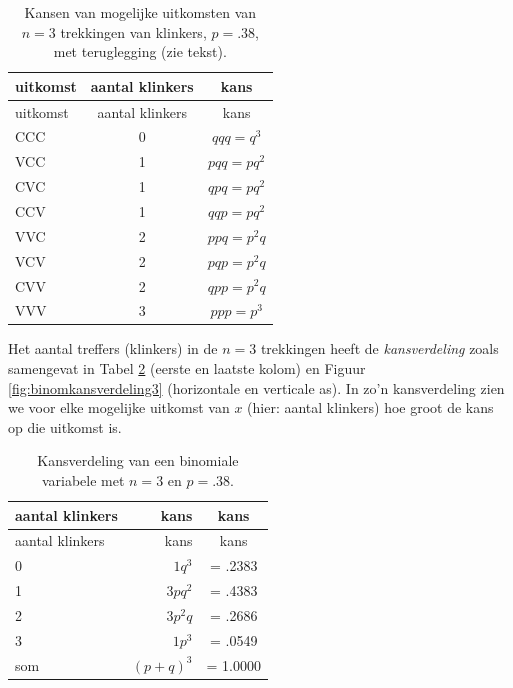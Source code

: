 \documentclass[
]{book}
\begin{document}
\begin{longtable}[]{@{}lcc@{}}
\caption{\label{tab:klinkerkansen} Kansen van mogelijke uitkomsten van \(n=3\) trekkingen van klinkers,
\(p=.38\), met teruglegging (zie tekst).}\tabularnewline
\toprule
uitkomst & aantal klinkers & kans\tabularnewline
\midrule
\endfirsthead
\toprule
uitkomst & aantal klinkers & kans\tabularnewline
\midrule
\endhead
CCC & 0 & \(qqq = q^3\)\tabularnewline
VCC & 1 & \(pqq = pq^2\)\tabularnewline
CVC & 1 & \(qpq = pq^2\)\tabularnewline
CCV & 1 & \(qqp = pq^2\)\tabularnewline
VVC & 2 & \(ppq = p^2q\)\tabularnewline
VCV & 2 & \(pqp = p^2q\)\tabularnewline
CVV & 2 & \(qpp = p^2q\)\tabularnewline
VVV & 3 & \(ppp = p^3\)\tabularnewline
\bottomrule
\end{longtable}

Het aantal treffers (klinkers) in de \(n=3\) trekkingen heeft de
\emph{kansverdeling} zoals samengevat in
Tabel \ref{tab:binomkansverdeling3} (eerste en laatste kolom) en
Figuur \ref{fig:binomkansverdeling3} (horizontale en verticale as).
In zo'n kansverdeling zien we voor elke mogelijke uitkomst van \(x\) (hier:
aantal klinkers) hoe groot de kans op die uitkomst is.

\begin{longtable}[]{@{}lrc@{}}
\caption{\label{tab:binomkansverdeling3} Kansverdeling van een binomiale variabele met \(n=3\) en \(p=.38\).}\tabularnewline
\toprule
aantal klinkers & kans & kans\tabularnewline
\midrule
\endfirsthead
\toprule
aantal klinkers & kans & kans\tabularnewline
\midrule
\endhead
0 & \(1 q^3\) & = .2383\tabularnewline
1 & \(3 p q^2\) & = .4383\tabularnewline
2 & \(3 p^2 q\) & = .2686\tabularnewline
3 & \(1 p^3\) & = .0549\tabularnewline
som & \((p+q)^3\) & = 1.0000\tabularnewline
\bottomrule
\end{longtable}
\end{document}
